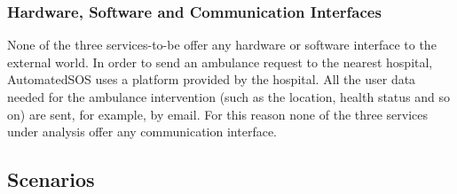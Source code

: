 \subsubsection{Hardware, Software and Communication Interfaces}
None of the three services-to-be offer any hardware or software interface to the external world. In order to send an ambulance request to the nearest hospital, AutomatedSOS uses a platform provided by the hospital. All the user data needed for the ambulance intervention (such as the location, health status and so on) are sent, for example, by email. For this reason none of the three services under analysis offer any communication interface.

\subsection{Scenarios}
